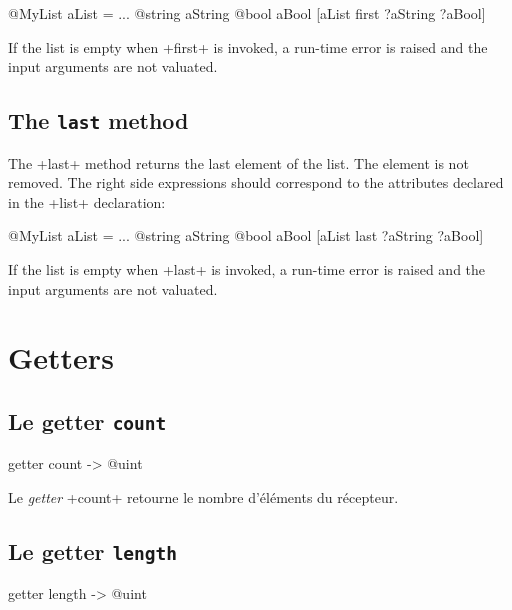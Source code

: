 \begin{galgas4}
@MyList aList = ...
@string aString
@bool aBool
[aList first ?aString ?aBool]
\end{galgas4}

If the list is empty when \ggsq+first+ is invoked, a run-time error is raised and the input arguments are not valuated.

\subsection{The \texttt{last} method}

The \ggsq+last+ method returns the last element of the list. The element is not removed. The right side expressions should correspond to the attributes declared in the \ggsq+list+ declaration:\\

\begin{galgas4}
@MyList aList = ...
@string aString
@bool aBool
[aList last ?aString ?aBool]
\end{galgas4}


If the list is empty when \ggsq+last+ is invoked, a run-time error is raised and the input arguments are not valuated.








\section{Getters}

\subsection{Le getter \texttt{count}}

\begin{galgas4}
getter count -> @uint
\end{galgas4}

Le \emph{getter} \ggsq+count+ retourne le nombre d'éléments du récepteur.



\subsection{Le getter \texttt{length}}

\begin{galgas4}
getter length -> @uint
\end{galgas4}

